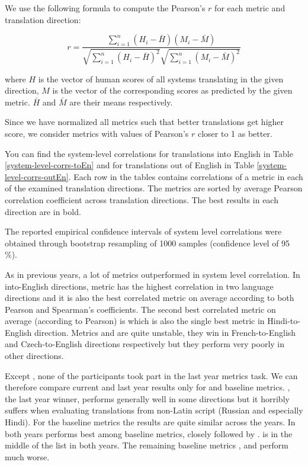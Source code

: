 We use the following formula to compute the Pearson's $r$ for each metric and
translation direction:

\begin{equation}
    r = \frac{\sum ^n _{i=1}(H_i - \bar{H})(M_i - \bar{M})}{\sqrt{\sum ^n _{i=1}(H_i - \bar{H})^2} \sqrt{\sum ^n _{i=1}(M_i - \bar{M})^2}} 
\end{equation}

\noindent where $H$ is the vector of human scores of all systems translating in
the given
direction, $M$ is the vector of the corresponding scores as predicted by the
given metric. $\bar{H}$ and $\bar{M}$ are their means respectively.

Since we have normalized all metrics such that better translations get higher
score, we consider metrics with values of Pearson's $r$ closer to 1 as better. 

You can find the system-level correlations for translations into English in
Table \ref{system-level-corrs-toEn} and for translations out of English in
Table \ref{system-level-corrs-outEn}. Each row in the tables contains
correlations of a metric in each of the examined translation directions. The
metrics are sorted by average Pearson correlation coefficient across
translation directions. The best results in each direction are in bold.

The reported empirical confidence intervals of system level correlations were
obtained through
bootstrap resampling of 1000
samples (confidence level of 95\,\%).

As in previous years, a lot of metrics outperformed  in system
level correlation. In into-English directions, metric
 has the highest correlation in two language
directions and it is also the best correlated metric on average according to both
Pearson and Spearman's coefficients. The second best correlated metric on
average (according to Pearson) is  which is also the single
best metric in Hindi-to-English direction.  Metrics  and
 are quite unstable, they win in French-to-English and
Czech-to-English directions respectively but they perform very poorly in other
directions. 

Except , none of the participants took part in the last year
metrics task.  We can therefore compare current and last year results only for
 and baseline metrics.  , the last year winner,
performs generally well in some directions but it horribly suffers when
evaluating translations from non-Latin script (Russian and especially Hindi).
For the baseline metrics the results are quite similar across the years. In
both years  performs best among baseline metrics, closely followed
by .  is in the middle of the list in both
years. The remaining baseline metrics , 
and  perform much worse.

